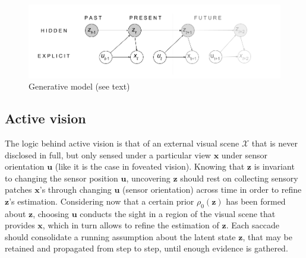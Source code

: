 \documentclass{article}
\begin{document}
\begin{figure}[t!]
	\centerline{
		\includegraphics[width = \linewidth]{img/ICLR-graphical-v2.png} 
	}
	\caption{Generative model (see text)}\label{fig:graphical}
\end{figure}


\subsection{Active vision}
The logic behind active vision is that of an external visual scene $\mathcal{X}$ that is never disclosed in full, but only sensed under a particular view $\boldsymbol{x}$ under sensor orientation $\boldsymbol{u}$ (like it is the case in foveated vision). 
Knowing that $\boldsymbol{z}$ is invariant to changing the sensor position $\boldsymbol{u}$, uncovering $\boldsymbol{z}$ should rest on
collecting sensory patches $\boldsymbol{x}$'s through changing $\boldsymbol{u}$ (sensor orientation) across time in order to refine $\boldsymbol{z}$'s estimation. 
Considering now that a certain prior $\rho_0
(\boldsymbol{z})$ has been formed about $\boldsymbol{z}$, choosing  $\boldsymbol{u}$ conducts the sight in a region of the visual scene that provides $\boldsymbol{x}$, which in turn allows to refine the estimation of $\boldsymbol{z}$.
Each saccade should consolidate a running assumption about the latent state $\boldsymbol{z}$, that may be retained and propagated from step to step, until enough evidence is gathered.
\end{document}
